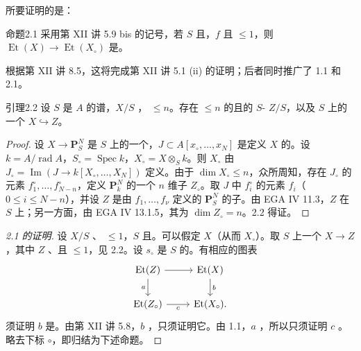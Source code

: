 所要证明的是：
\begin{SGAresult}{命题}{2.1}
采用第 XII 讲 5.9 bis 的记号，若 $S$ 且，$f$ 且 $\leq1$，则 $\operatorname{Et}(X)\to\operatorname{Et}(X_\circ)$ 是。
\end{SGAresult}
根据第 XII 讲 8.5，这将完成第 XII 讲 5.1 (ii) 的证明；后者同时推广了 1.1 和 2.1。
\begin{SGAresult}{引理}{2.2}
设 $S$ 是 $A$ 的谱，$X/S$ ， $\leq n$。存在 $\leq n$ 的且的 $S$- $Z/S$，以及 $S$ 上的一个 $X\hookrightarrow Z$。
\end{SGAresult}
\begin{proof}
设 $X\to\mathbf P_S^N$ 是 $S$ 上的一个，$J\subset A[x_\circ,\ldots,x_N]$ 是定义 $X$ 的。设 $k=A/\operatorname{rad}A$，$S_\circ=\operatorname{Spec}k$，$X_\circ=X\otimes_S k$。则 $X_\circ$ 由 $J_\circ=\operatorname{Im}(J\to k[X_\circ,\ldots,X_N])$ 定义。由于 $\dim X_\circ\leq n$，众所周知，存在 $J_\circ$ 的元素 $f_1^\circ,\ldots,f_{N-n}^\circ$，定义 $\mathbf P_k^N$ 的一个 $n$ 维子 $Z_\circ$。取 $J$ 中 $f_i^\circ$ 的元素 $f_i$（$0\leq i\leq N-n$），并设 $Z$ 是由 $f_1,\ldots,f_\nu$ 定义的 $\mathbf P_S^N$ 的子。由 EGA IV 11.3，$Z$ 在 $S$ 上；另一方面，由 EGA IV 13.1.5，其为 $\dim Z_\circ=n$。2.2 得证。
\end{proof}
\begin{proof}[2.1 的证明]
设 $X/S$ 、 $\leq1$，$S$ 且。可以假定 $X$（从而 $X_\circ$）。取 $S$ 上一个 $X\to Z$，其中 $Z$ 、且 $\leq1$，见 2.2。设 $s_\circ$ 是 $S$ 的。有相应的图表
\[
\begin{tikzcd}
\operatorname{Et}(Z)\arrow[r]\arrow[d,"a"']&\operatorname{Et}(X)\arrow[d,"b"]\\
\operatorname{Et}(Z_\circ)\arrow[r,"c"']&\operatorname{Et}(X_\circ).
\end{tikzcd}
\]
须证明 $b$ 是。由第 XII 讲 5.8，$b$ ，只须证明它。由 1.1，$a$ ，所以只须证明 $c$ 。略去下标 $\circ$，即归结为下述命题。
\end{proof}
